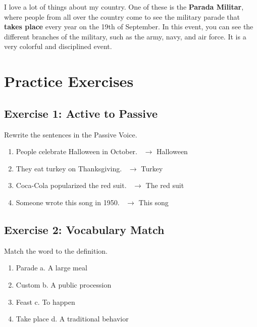 \begin{examplebox}[title=Sample Description: Military Parade in Chile]
I love a lot of things about my country. One of these is the \textbf{Parada Militar}, where people from all over the country come to see the military parade that \textbf{takes place} every year on the 19th of September.
In this event, you can see the different branches of the military, such as the army, navy, and air force. It is a very colorful and disciplined event.
\end{examplebox}

\section{Practice Exercises}

\subsection{Exercise 1: Active to Passive}
Rewrite the sentences in the Passive Voice.

\begin{enumerate}
    \item People celebrate Halloween in October. \
    $\rightarrow$ Halloween \underline{\hspace{6cm}}
    \item They eat turkey on Thanksgiving. \
    $\rightarrow$ Turkey \underline{\hspace{6cm}}
    \item Coca-Cola popularized the red suit. \
    $\rightarrow$ The red suit \underline{\hspace{6cm}}
    \item Someone wrote this song in 1950. \
    $\rightarrow$ This song \underline{\hspace{6cm}}
\end{enumerate}

\subsection{Exercise 2: Vocabulary Match}
Match the word to the definition.

\begin{enumerate}
    \item Parade \hspace{3cm} a. A large meal
    \item Custom \hspace{3cm} b. A public procession
    \item Feast \hspace{3cm} c. To happen
    \item Take place \hspace{3cm} d. A traditional behavior
\end{enumerate}

